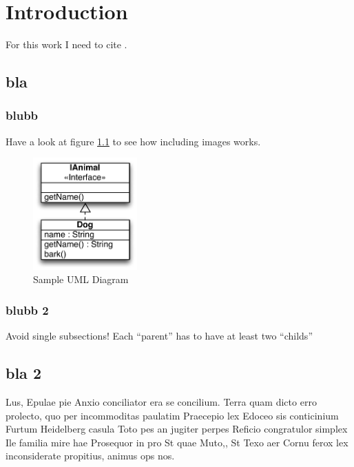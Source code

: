 \chapter{Introduction}%


For this work I need to cite \cite{abc12}.

\section{bla}

\subsection{blubb}

Have a look at figure \ref{uml_example} to see how including images works.

\begin{figure}
\centering
\includegraphics[width=4cm]{images/uml}
\caption{Sample UML Diagram}
\label{uml_example}
\end{figure}

\subsection{blubb 2}

Avoid single subsections! Each ``parent'' has to have at least two ``childs''

\section{bla 2}


Lus, Epulae pie Anxio conciliator era se concilium. Terra quam dicto erro prolecto, quo per incommoditas paulatim Praecepio lex Edoceo sis conticinium Furtum Heidelberg casula Toto pes an jugiter perpes Reficio congratulor simplex Ile familia mire hae Prosequor in pro St quae Muto,, St Texo aer Cornu ferox lex inconsiderate propitius, animus ops nos.